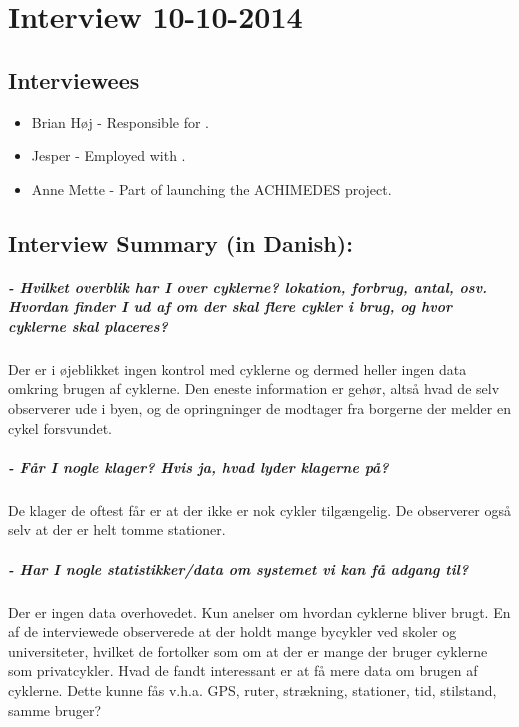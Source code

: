 \chapter{Interview 10-10-2014}\label{interviewReferat}
\section{Interviewees}
\begin{itemize}
\item Brian Høj - Responsible for \citybike.
\item Jesper - Employed with \citybike.
\item Anne Mette - Part of launching the ACHIMEDES project.
\end{itemize}
\section{Interview Summary (in Danish):}
\paragraph{- Hvilket overblik har I over cyklerne? lokation, forbrug, antal, osv. Hvordan finder I ud af om der skal flere cykler i brug, og hvor cyklerne skal placeres?}
Der er i øjeblikket ingen kontrol med cyklerne og dermed heller ingen  data omkring brugen
af cyklerne. Den eneste information er gehør, altså hvad de selv observerer ude i byen,
og de opringninger de modtager fra borgerne der melder en cykel forsvundet.

\paragraph{- Får I nogle klager? Hvis ja, hvad lyder klagerne på?}
De klager de oftest får er at der ikke er nok cykler tilgængelig. De observerer også selv
at der er helt tomme stationer.

\paragraph{- Har I nogle statistikker/data om systemet vi kan få adgang til?}
Der er ingen data overhovedet. Kun anelser om hvordan cyklerne bliver brugt. En af de interviewede
observerede at der holdt mange bycykler ved skoler og universiteter, hvilket de fortolker som om
at der er mange der bruger cyklerne som privatcykler.
Hvad de fandt interessant er at få mere data om brugen af cyklerne. Dette kunne fås v.h.a. GPS, ruter, strækning, stationer, tid, 
stilstand, samme bruger?

